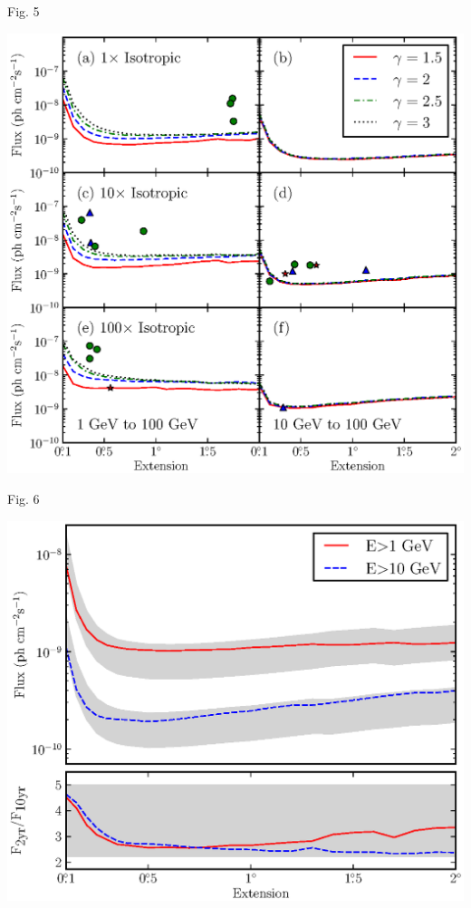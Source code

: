 \documentclass[12pt]{beamer}
\begin{document}
\begin{frame}{Fig. 5}
  \begin{center}
    \includegraphics[scale=0.5]{../paper/mc_plots/all_sensitivity_color.eps}
  \end{center}
\end{frame}

\begin{frame}{Fig. 6}
  \begin{center}
    \includegraphics[scale=0.5]{../paper/mc_plots/time_sensitivity_color.eps}
  \end{center}
\end{frame}
\end{document}

